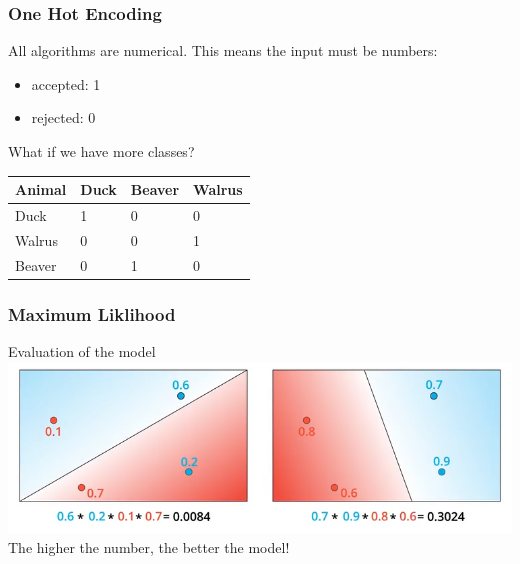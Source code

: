 \begin{frame}[fragile]
  \frametitle{One Hot Encoding}
  All algorithms are numerical. This means the input must be numbers:\\
  \begin{itemize}
  \item accepted: 1
  \item rejected: 0
  \end{itemize}
  What if we have more classes?

  \vspace{5mm}

  \begin{tabular}{l|l|l|l}
  Animal & Duck & Beaver & Walrus\\
  \hline
  Duck & 1 & 0 & 0\\
  Walrus & 0 & 0 & 1\\
  Beaver & 0 & 1 & 0\\
  \hline
  \end{tabular}
\end{frame}

\begin{frame}[fragile]
  \frametitle{Maximum Liklihood}
  Evaluation of the model\\
  \vspace{3mm}
  \includegraphics[scale=0.3]{img/maximum_liklihood}\\
  \vspace{3mm}
  The higher the number, the better the model!
\end{frame}

